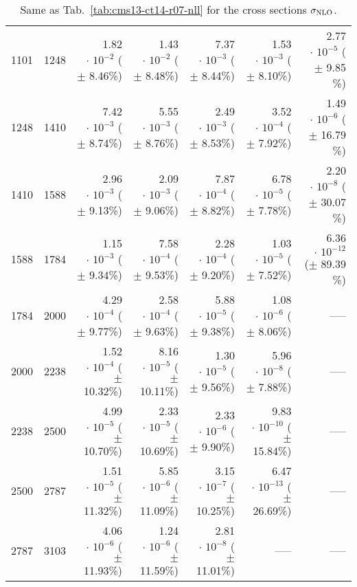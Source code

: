 \begin{table}[h!]
\begin{center}
\begin{tabular}{|r|r|r|r|r|r|r|}
1101 & 1248 & 1.82$\,\cdot\, 10^{-2}$  ($\pm\!\!$  8.46\%) & 1.43$\,\cdot\, 10^{-2}$  ($\pm\!\!$  8.48\%) & 7.37$\,\cdot\, 10^{-3}$  ($\pm\!\!$  8.44\%) & 1.53$\,\cdot\, 10^{-3}$  ($\pm\!\!$  8.10\%) & 2.77$\,\cdot\, 10^{-5}$  ($\pm\!\!$  9.85 \%)\\
1248 & 1410 & 7.42$\,\cdot\, 10^{-3}$  ($\pm\!\!$  8.74\%) & 5.55$\,\cdot\, 10^{-3}$  ($\pm\!\!$  8.76\%) & 2.49$\,\cdot\, 10^{-3}$  ($\pm\!\!$  8.53\%) & 3.52$\,\cdot\, 10^{-4}$  ($\pm\!\!$  7.92\%) & 1.49$\,\cdot\, 10^{-6}$  ($\pm\!\!$ 16.79 \%)\\
1410 & 1588 & 2.96$\,\cdot\, 10^{-3}$  ($\pm\!\!$  9.13\%) & 2.09$\,\cdot\, 10^{-3}$  ($\pm\!\!$  9.06\%) & 7.87$\,\cdot\, 10^{-4}$  ($\pm\!\!$  8.82\%) & 6.78$\,\cdot\, 10^{-5}$  ($\pm\!\!$  7.78\%) & 2.20$\,\cdot\, 10^{-8}$  ($\pm\!\!$ 30.07 \%)\\
1588 & 1784 & 1.15$\,\cdot\, 10^{-3}$  ($\pm\!\!$  9.34\%) & 7.58$\,\cdot\, 10^{-4}$  ($\pm\!\!$  9.53\%) & 2.28$\,\cdot\, 10^{-4}$  ($\pm\!\!$  9.20\%) & 1.03$\,\cdot\, 10^{-5}$  ($\pm\!\!$  7.52\%) & 6.36$\,\cdot\, 10^{-12}$  ($\pm\!\!$ 89.39 \%)\\
1784 & 2000 & 4.29$\,\cdot\, 10^{-4}$  ($\pm\!\!$  9.77\%) & 2.58$\,\cdot\, 10^{-4}$  ($\pm\!\!$  9.63\%) & 5.88$\,\cdot\, 10^{-5}$  ($\pm\!\!$  9.38\%) & 1.08$\,\cdot\, 10^{-6}$  ($\pm\!\!$  8.06\%) & -----\\
2000 & 2238 & 1.52$\,\cdot\, 10^{-4}$  ($\pm\!\!$ 10.32\%) & 8.16$\,\cdot\, 10^{-5}$  ($\pm\!\!$ 10.11\%) & 1.30$\,\cdot\, 10^{-5}$  ($\pm\!\!$  9.56\%) & 5.96$\,\cdot\, 10^{-8}$  ($\pm\!\!$  7.88\%) & -----\\
2238 & 2500 & 4.99$\,\cdot\, 10^{-5}$  ($\pm\!\!$ 10.70\%) & 2.33$\,\cdot\, 10^{-5}$  ($\pm\!\!$ 10.69\%) & 2.33$\,\cdot\, 10^{-6}$  ($\pm\!\!$  9.90\%) & 9.83$\,\cdot\, 10^{-10}$  ($\pm\!\!$ 15.84\%) & -----\\
2500 & 2787 & 1.51$\,\cdot\, 10^{-5}$  ($\pm\!\!$ 11.32\%) & 5.85$\,\cdot\, 10^{-6}$  ($\pm\!\!$ 11.09\%) & 3.15$\,\cdot\, 10^{-7}$  ($\pm\!\!$ 10.25\%) & 6.47$\,\cdot\, 10^{-13}$  ($\pm\!\!$ 26.69\%) & -----\\
2787 & 3103 & 4.06$\,\cdot\, 10^{-6}$  ($\pm\!\!$ 11.93\%) & 1.24$\,\cdot\, 10^{-6}$  ($\pm\!\!$ 11.59\%) & 2.81$\,\cdot\, 10^{-8}$  ($\pm\!\!$ 11.01\%) & ----- & -----\\
%
\hline
\end{tabular}
\caption{\label{tab:cms13-ct14-r07}
  Same as Tab.~\ref{tab:cms13-ct14-r07-nll} for the cross sections $\sigma_{\rm NLO}$.
}
\end{center}
\end{table}
